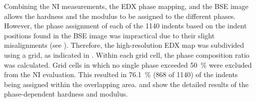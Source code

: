 Combining the \ac{NI} measurements, the \ac{EDX} phase mapping, and the \ac{BSE} image allows the hardness and the modulus to be assigned to the different phases.
However, the phase assignment of each of the \num{1140} indents based on the indent positions found in the \ac{BSE} image was impractical due to their slight misalignments (see ).
Therefore, the high-resolution \ac{EDX} map was subdivided using a grid, as indicated in .
Within each grid cell, the phase composition ratio was calculated.
Grid cells in which no single phase exceeded \qty{50}{\percent} were excluded from the \ac{NI} evaluation.
This resulted in \qty{76.1}{\percent} (\num{868} of \num{1140}) of the indents being assigned within the overlapping area.
 and  show the detailed results of the phase-dependent hardness and modulus.

